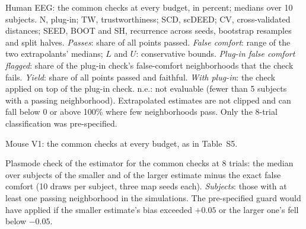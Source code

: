 \begin{table}[!htb]
\centering\scriptsize

\caption{Human EEG: the common checks at every budget, in percent; medians over 10 subjects. N,
plug-in; TW, trustworthiness; SCD, scDEED; CV, cross-validated distances; SEED, BOOT and SH,
recurrence across seeds, bootstrap resamples and split halves.
\emph{Passes}: share of all points passed. \emph{False comfort}: range of the two extrapolants'
medians; $L$ and $U$: conservative bounds. \emph{Plug-in false comfort flagged}: share of the
plug-in check's false-comfort neighborhoods that the check fails. \emph{Yield}: share of all points
passed and faithful. \emph{With plug-in}: the check applied on top of the plug-in check. n.e.: not
evaluable (fewer than 5 subjects with a passing neighborhood). Extrapolated estimates are not
clipped and can fall below 0 or above 100\% where few neighborhoods pass. Only the 8-trial
classification was pre-specified.}
\end{table}

\begin{table}[!htb]
\centering\scriptsize

\caption{Mouse V1: the common checks at every budget, as in Table~S5.}
\end{table}

\begin{table}[!htb]
\centering\small

\caption{Plasmode check of the estimator for the common checks at 8 trials: the median over
subjects of the smaller and of the larger estimate minus the exact false comfort (10 draws per
subject, three map seeds each). \emph{Subjects}: those with at least one passing neighborhood in
the simulations. The pre-specified guard would have applied if the smaller estimate's bias
exceeded $+0.05$ or the larger one's fell below $-0.05$.}
\end{table}
